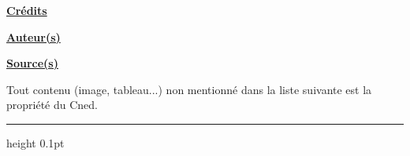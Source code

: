 
\clearpage
\null
\vfill
\noindent
\begin{minipage}{\textwidth}


\noindent
{}

\vspace{0.8em}

\noindent
\hyperlink{target}{%
  {\fontsize{16}{18}\selectfont\textbf{Crédits}}%
}

\vspace{0.5em}

\noindent
\underline{\textbf{\fontsize{10}{12}\selectfont Auteur(s)}}\\[0.4em]
\makeatletter
{\robotoMedium\fontsize{7.5}{9}\selectfont\@author\par}
\makeatother

\vspace{0.6em}

\noindent
\underline{\textbf{\fontsize{10}{12}\selectfont Source(s)}}\\[0.4em]

{\fontsize{7.5}{9}\selectfont
Tout contenu (image, tableau...) non mentionné dans la liste suivante est la propriété du Cned.

\vspace{0.3em}

\begin{itemize}[dash][primary]
  \mescredits
\end{itemize}
\par}

\vspace{0.5em}

\noindent
{\color{secondarycolor}\hrule height 0.1pt}

\vspace{0.6em}


\end{minipage}
